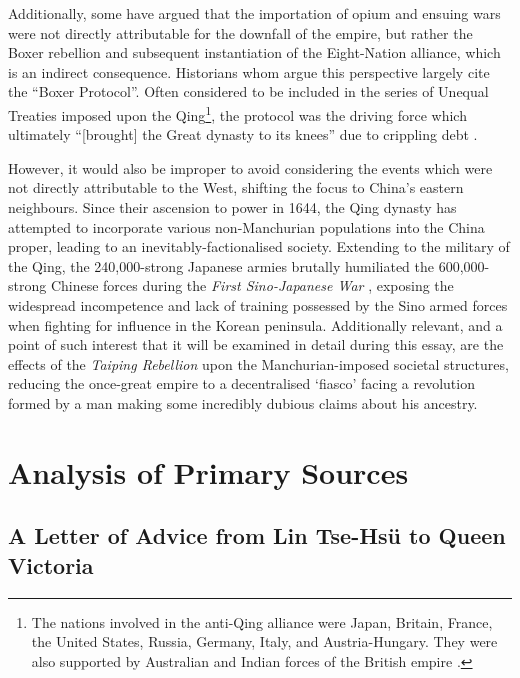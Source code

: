 \documentclass{article}
\begin{document}
        Additionally, some have argued that the importation of opium and ensuing wars were not directly attributable for the downfall of the empire, but rather the Boxer rebellion and subsequent instantiation of the Eight-Nation alliance, which is an indirect consequence. Historians whom argue this perspective largely cite the ``Boxer Protocol''. Often considered to be included in the series of Unequal Treaties imposed upon the Qing\footnote{The nations involved in the anti-Qing alliance were Japan, Britain, France, the United States, Russia, Germany, Italy, and Austria-Hungary. They were also supported by Australian and Indian forces of the British empire \autocite{Gardener:2016}.}, the protocol was the driving force which ultimately ``[brought] the Great dynasty to its knees'' due to crippling debt \autocite{Mitchell:2008}.

        However, it would also be improper to avoid considering the events which were not directly attributable to the West, shifting the focus to China's eastern neighbours. Since their ascension to power in 1644, the Qing dynasty has attempted to incorporate various non-Manchurian populations into the China proper, leading to an inevitably-factionalised society. Extending to the military of the Qing, the 240,000-strong Japanese armies brutally humiliated the 600,000-strong Chinese forces during the \textit{First Sino-Japanese War} \autocite{Fenby:2013}, exposing the widespread incompetence and lack of training possessed by the Sino armed forces \autocite{Jowett:2013} when fighting for influence in the Korean peninsula. Additionally relevant, and a point of such interest that it will be examined in detail during this essay, are the effects of the \textit{Taiping Rebellion} upon the Manchurian-imposed societal structures, reducing the once-great empire to a decentralised `fiasco' facing a revolution formed by a man making some incredibly dubious claims about his ancestry.

\section{Analysis of Primary Sources}

\subsection{A Letter of Advice from Lin Tse-Hs\"u to Queen Victoria}
\end{document}
